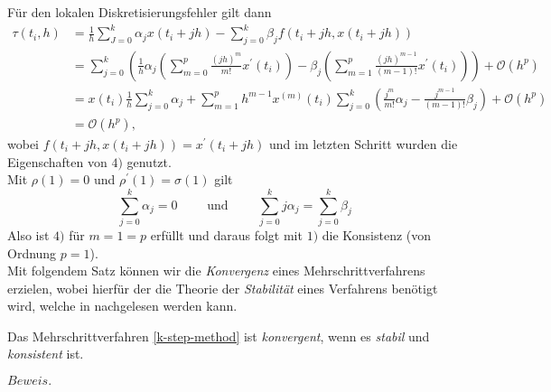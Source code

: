 Für den lokalen Diskretisierungsfehler gilt dann
\begin{align*}
    \tau(t_i,h) &= \frac{1}{h} \sum_{J=0}^{k} \alpha_j x(t_i + jh) - \sum_{j=0}^{k} \beta_j f(t_i+jh,x(t_i+jh))\\
    &= \sum_{j=0}^{k}\left( \frac{1}{h}\alpha_j \left( \sum_{m=0}^{p} \frac{(jh)^m}{m!}x^{\prime}(t_i)  \right)
    - \beta_j \left( \sum_{m=1}^{p} \frac{(jh)^{m-1}}{(m-1)!}x^{\prime}(t_i) \right) \right) + \mathcal{O}(h^p) \\
    &= x(t_i) \frac{1}{h} \sum_{j=0}^{k} \alpha_j + \sum_{m=1}^{p} h^{m-1} x^{(m
    )}(t_i)
    \sum_{j=0}^{k}\left( \frac{j^m}{m!} \alpha_j - \frac{j^{m-1}}{(m-1)!} \beta_j \right) + \mathcal{O}(h^p)\\
    &= \mathcal{O}(h^p),
\end{align*}
wobei $f(t_i+jh,x(t_i+jh)) = x^{\prime}(t_i+jh)$ und im letzten Schritt wurden die Eigenschaften von $4)$ genutzt.\\
Mit $\rho(1) = 0$ und $\rho^{\prime}(1)=\sigma(1)$ gilt
\[
    \sum_{j=0}^{k} \alpha_j = 0 \qquad \text{ und } \qquad \sum_{j=0}^{k} j \alpha_j = \sum_{j=0}^{k} \beta_j
\]
Also ist $4)$ für $m=1=p$ erfüllt und daraus folgt mit $1)$ die Konsistenz (von Ordnung $p=1$). \qedwhite \\
Mit folgendem Satz können wir die \textit{Konvergenz} eines Mehrschrittverfahrens erzielen, wobei hierfür der die
Theorie der \textit{Stabilität} eines Verfahrens benötigt wird, welche in
\cite[80]{ernsthairergerhardwannerSolvingOrdinaryDifferential} nachgelesen werden kann.
\begin{satz}
    Das Mehrschrittverfahren \eqref{k-step-method} ist {\em konvergent}, wenn es {\em stabil} und {\em konsistent} ist.
\end{satz}
$Beweis.$ \cite[392-393]{ernsthairergerhardwannerSolvingOrdinaryDifferential}

